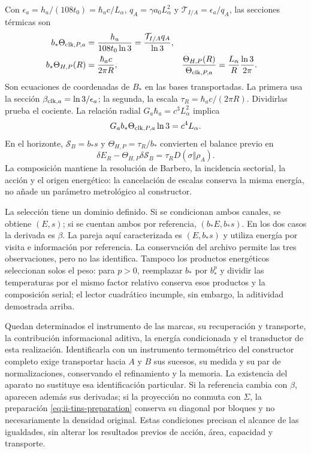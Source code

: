 Con $\epsilon_a=h_a/(108t_0)=\hbar_ac/L_\alpha$,
$q_A=\gamma a_0L_\alpha^2$ y
$\mathcal T_{I/A}=\epsilon_a/q_A$, las secciones térmicas son
\begin{align}
 b_*\Theta_{{\rm clk},P,a}
 &=\frac{h_a}{108t_0\ln3}
 =\frac{\mathcal T_{I/A}q_A}{\ln3},\nonumber\\
 b_*\Theta_{H,P}(R)&=\frac{\hbar_ac}{2\pi R},&
 \frac{\Theta_{H,P}(R)}{\Theta_{{\rm clk},P,a}}
 &=\frac{L_\alpha}{R}\frac{\ln3}{2\pi}.
 \label{eq:ii-tins-action-area}
\end{align}
Son ecuaciones de coordenadas de $B_*$ en las bases transportadas.
La primera usa la sección $\beta_{{\rm clk},a}=\ln3/\epsilon_a$;
la segunda, la escala $\tau_R=\hbar_ac/(2\pi R)$. Dividirlas prueba
el cociente. La relación radial $G_a\hbar_a=c^3L_\alpha^2$ implica
\begin{equation}
 G_ab_*\Theta_{{\rm clk},P,a}\ln3=c^4L_\alpha.
 \label{eq:ii-tins-gravity}
\end{equation}
En el horizonte, $\mathcal S_B=b_*s$ y
$\Theta_{H,P}=\tau_R/b_*$ convierten el balance previo en
\[
 \delta E_R-\Theta_{H,P}\delta\mathcal S_B
 =\tau_RD(\sigma\Vert\rho_A).
\]
La composición mantiene la resolución de Barbero, la incidencia sectorial,
la acción y el origen energético: la cancelación de escalas conserva la
misma energía, no añade un parámetro metrológico al constructor.

La selección tiene un dominio definido. Si se condicionan ambos canales,
se obtiene $(E,s)$; si se cuentan ambos por referencia, $(b_*E,b_*s)$.
En los dos casos la derivada es $\beta$. La pareja aquí caracterizada es
$(E,b_*s)$ y utiliza energía por visita e información por referencia.
La conservación del archivo permite las tres observaciones, pero no las
identifica. Tampoco los productos energéticos seleccionan solos el peso:
para $p>0$, reemplazar $b_*$ por $b_*^p$ y dividir las temperaturas por
el mismo factor relativo conserva esos productos y la composición serial;
el lector cuadrático incumple, sin embargo, la aditividad demostrada arriba.

Quedan determinados el instrumento de las marcas, su recuperación y
transporte, la contribución informacional aditiva, la energía condicionada
y el transductor de esta realización. Identificarla con un instrumento
termométrico del constructor completo exige transportar hacia $A$ y $B$
sus sucesos, su medida y su par de normalizaciones, conservando el
refinamiento y la memoria. La existencia del aparato no sustituye esa
identificación particular. Si la referencia cambia con $\beta$, aparecen
además sus derivadas; si la proyección no conmuta con $\Sigma$, la preparación
\eqref{eq:ii-tins-preparation} conserva su diagonal por bloques y no
necesariamente la densidad original. Estas condiciones precisan el alcance
de las igualdades, sin alterar los resultados previos de acción, área,
capacidad y transporte.
